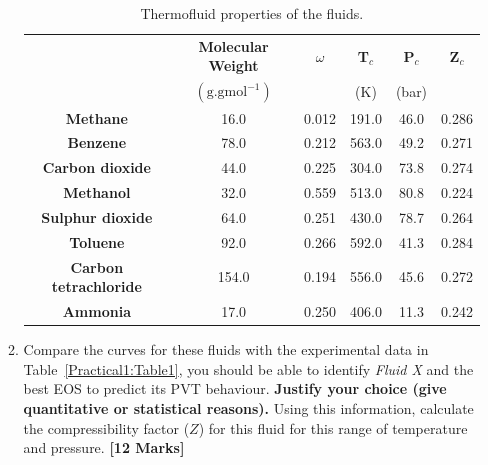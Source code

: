 \documentclass[12pts,a4paper,amsmath,amssymb,floatfix]{article}%
\begin{document}
\begin{enumerate}[label=\bfseries Problem \arabic*:]
\begin{enumerate}[label=\bfseries Task \arabic*]
\begin{table}[h]
\begin{center}
\begin{tabular}{||c | c c c c c ||} 
\hline\hline
                          & {\bf Molecular Weight}           &  {\bf $\omega$}  & {\bf T$_{c}$}  & {\bf P$_{c}$} & {\bf Z$_{c}$}  \\
                          & $\left(\text{g.gmol}^{-1}\right)$ &                  &   (K)         &   (bar)       &               \\ 
\hline
{\bf Methane}             & 16.0                             &  0.012           &  191.0         &  46.0        &    0.286      \\  
{\bf Benzene}             & 78.0                             &  0.212           &  563.0         &  49.2        &    0.271       \\  
{\bf Carbon dioxide}      & 44.0                             &  0.225           &  304.0         &  73.8        &    0.274       \\  
{\bf Methanol}            & 32.0                             &  0.559           &  513.0         &  80.8        &    0.224       \\  
{\bf Sulphur dioxide}     & 64.0                             &  0.251           &  430.0         &  78.7        &    0.264       \\  
{\bf Toluene}             & 92.0                             &  0.266           &  592.0         &  41.3        &    0.284       \\  
{\bf Carbon tetrachloride}& 154.0                            &  0.194           &  556.0         &  45.6        &    0.272       \\  
{\bf Ammonia}             & 17.0                             &  0.250           &  406.0         &  11.3        &    0.242       \\  
\hline\hline
\end{tabular}
\caption{Thermofluid properties of the fluids.}
\label{Practical1:Table2}
\end{center}
\end{table}

\item\label{Practical1:Task2} Compare the curves for these fluids with the experimental data in Table~\ref{Practical1:Table1}, you should be able to identify {\it Fluid X} and the best EOS to predict its PVT behaviour. {\bf Justify your choice (give quantitative or statistical reasons).} Using this information, calculate the compressibility factor ($Z$) for this fluid for this range of temperature and pressure. \hfill{\bf[12 Marks]}


\end{enumerate}
\end{enumerate}
\end{document}
